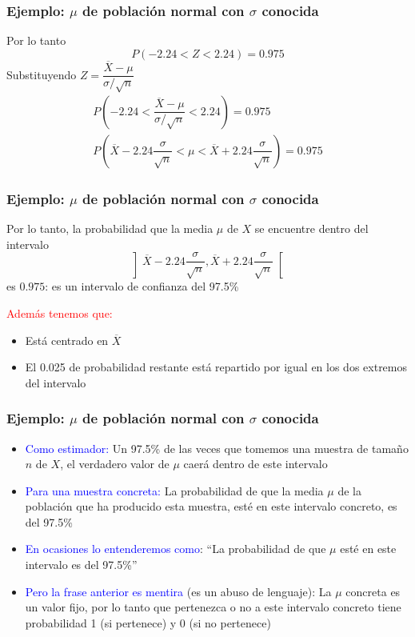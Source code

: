 \documentclass[12pt,t]{beamer}\usepackage[]{graphicx}\usepackage[]{color}
\newcommand{\red}[1]{\textcolor{red}{#1}}
\newcommand{\blue}[1]{\textcolor{blue}{#1}}
\renewcommand{\emph}[1]{{\color{red}#1}}
\theoremstyle{plain}
\theoremstyle{definition}
\begin{document}
\begin{frame}
\frametitle{Ejemplo: $\mu$ de población normal con $\sigma$ conocida}
Por lo tanto
$$
P(-2.24<Z<2.24)=0.975
$$
Substituyendo $Z=\dfrac{\overline{X}-\mu}{\sigma/\sqrt{n}}$
$$
\begin{array}{c}
P\left(-2.24<\dfrac{\overline{X}-\mu}{\sigma/\sqrt{n}}
<2.24\right)=0.975\\[3ex]
P\left(\overline{X} -2.24 \dfrac{\sigma}{\sqrt{n}}< \mu< \overline{X}+
2.24\dfrac{\sigma}{\sqrt{n}}\right)=0.975
\end{array}
$$
\end{frame}

\begin{frame}
\frametitle{Ejemplo: $\mu$ de población normal con $\sigma$ conocida}
Por  lo tanto, la probabilidad que la media  $\mu$ de $X$ 
se encuentre dentro del intervalo
$$
\left]\overline{X} -2.24 \frac{\sigma}{\sqrt{n}},
\overline{X}+ 2.24\frac{\sigma}{\sqrt{n}}
\right[
$$
es $0.975$: es un intervalo de confianza  del 97.5\%
\medskip

\red{Además tenemos que:}
\begin{itemize}
\item Está centrado en $\overline{X}$
\medskip

\item El 0.025 de probabilidad restante  está repartido por igual en los dos extremos del intervalo
\end{itemize}
\end{frame}

\begin{frame}
\frametitle{Ejemplo: $\mu$ de población normal con $\sigma$ conocida}


\begin{itemize}
\item \blue{Como  estimador:} Un 97.5\% de las veces  que tomemos una muestra de tamaño $n$ de $X$, el verdadero valor de $\mu$ caerá dentro de este intervalo 
\medskip

\item \blue{Para una muestra concreta:} La probabilidad de que la media  $\mu$ de la población que ha producido esta muestra, esté en este intervalo concreto, es del 97.5\%
\medskip

\item \blue{En ocasiones lo entenderemos como}:  ``La probabilidad de que $\mu$ esté en este intervalo es del 97.5\%''
\medskip

\item \blue{Pero la frase anterior es mentira} (\emph{es un abuso de lenguaje}): La $\mu$ concreta es un valor fijo, por lo  tanto  que pertenezca o   no a este intervalo concreto tiene probabilidad 1 (si   pertenece) y 0 (si no  pertenece) 
\end{itemize}


\end{frame}
\end{document}
